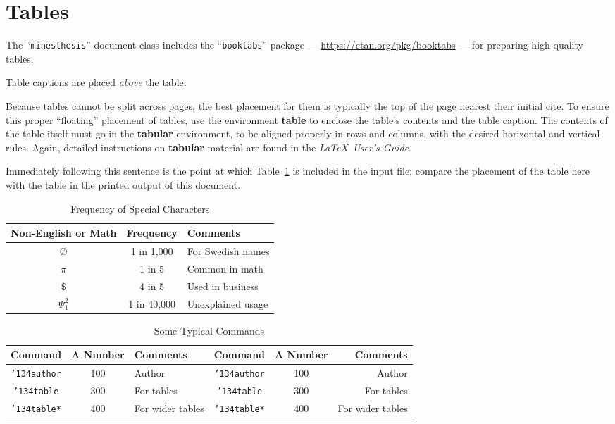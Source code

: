 \section{Tables}

The ``\verb|minesthesis|'' document class includes the ``\verb|booktabs|''
package --- \url{https://ctan.org/pkg/booktabs} --- for preparing
high-quality tables.

Table captions are placed {\itshape above} the table.

Because tables cannot be split across pages, the best placement for
them is typically the top of the page nearest their initial cite. To
ensure this proper ``floating'' placement of tables, use the
environment \textbf{table} to enclose the table's contents and the
table caption. The contents of the table itself must go in the
\textbf{tabular} environment, to be aligned properly in rows and
columns, with the desired horizontal and vertical rules. Again,
detailed instructions on \textbf{tabular} material are found in the
\textit{\LaTeX\ User's Guide}.

Immediately following this sentence is the point at which
Table~\ref{tab:freq} is included in the input file; compare the
placement of the table here with the table in the printed output of
this document.

\begin{table}[h]
	\caption{Frequency of Special Characters}
	\label{tab:freq}
	\centering
	\begin{tabular}{ccl}
		\toprule
		Non-English or Math & Frequency   & Comments          \\
		\midrule
		\O                  & 1 in 1,000  & For Swedish names \\
		$\pi$               & 1 in 5      & Common in math    \\
		\$                  & 4 in 5      & Used in business  \\
		$\Psi^2_1$          & 1 in 40,000 & Unexplained usage \\
		\bottomrule
	\end{tabular}
\end{table}


\begin{table*}[h]
	\caption{Some Typical Commands}
	\label{tab:commands}
	\centering
	\begin{tabular}{cclccr}
		\toprule
		Command                    & A Number & Comments         & Command                    & A Number & Comments         \\
		\midrule
		\texttt{{\char'134}author} & 100      & Author           & \texttt{{\char'134}author} & 100      & Author           \\
		\texttt{{\char'134}table}  & 300      & For tables       & \texttt{{\char'134}table}  & 300      & For tables       \\
		\texttt{{\char'134}table*} & 400      & For wider tables & \texttt{{\char'134}table*} & 400      & For wider tables \\
		\bottomrule
	\end{tabular}
\end{table*}

